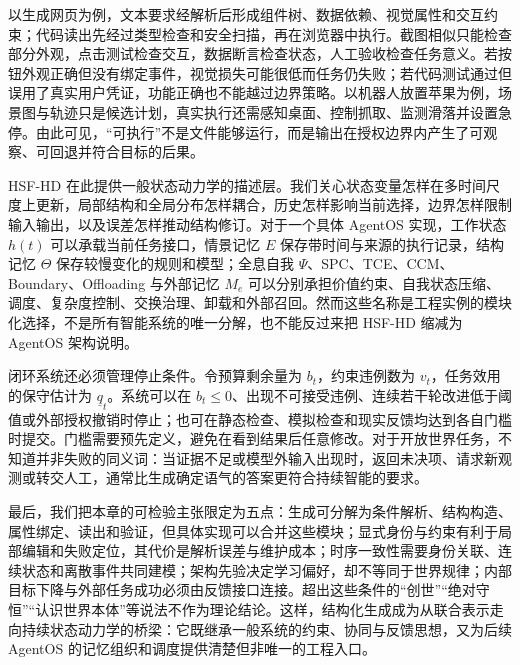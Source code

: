 以生成网页为例，文本要求经解析后形成组件树、数据依赖、视觉属性和交互约束；代码读出先经过类型检查和安全扫描，再在浏览器中执行。截图相似只能检查部分外观，点击测试检查交互，数据断言检查状态，人工验收检查任务意义。若按钮外观正确但没有绑定事件，视觉损失可能很低而任务仍失败；若代码测试通过但误用了真实用户凭证，功能正确也不能越过边界策略。以机器人放置苹果为例，场景图与轨迹只是候选计划，真实执行还需感知桌面、控制抓取、监测滑落并设置急停。由此可见，“可执行”不是文件能够运行，而是输出在授权边界内产生了可观察、可回退并符合目标的后果。

HSF-HD 在此提供一般状态动力学的描述层。我们关心状态变量怎样在多时间尺度上更新，局部结构和全局分布怎样耦合，历史怎样影响当前选择，边界怎样限制输入输出，以及误差怎样推动结构修订。对于一个具体 AgentOS 实现，工作状态 $h(t)$ 可以承载当前任务接口，情景记忆 $E$ 保存带时间与来源的执行记录，结构记忆 $\Theta$ 保存较慢变化的规则和模型；全息自我 $\Psi$、SPC、TCE、CCM、Boundary、Offloading 与外部记忆 $M_e$ 可以分别承担价值约束、自我状态压缩、调度、复杂度控制、交换治理、卸载和外部召回。然而这些名称是工程实例的模块化选择，不是所有智能系统的唯一分解，也不能反过来把 HSF-HD 缩减为 AgentOS 架构说明。

闭环系统还必须管理停止条件。令预算剩余量为 $b_t$，约束违例数为 $v_t$，任务效用的保守估计为 $\underline q_t$。系统可以在 $b_t\le0$、出现不可接受违例、连续若干轮改进低于阈值或外部授权撤销时停止；也可在静态检查、模拟检查和现实反馈均达到各自门槛时提交。门槛需要预先定义，避免在看到结果后任意修改。对于开放世界任务，不知道并非失败的同义词：当证据不足或模型外输入出现时，返回未决项、请求新观测或转交人工，通常比生成确定语气的答案更符合持续智能的要求。

最后，我们把本章的可检验主张限定为五点：生成可分解为条件解析、结构构造、属性绑定、读出和验证，但具体实现可以合并这些模块；显式身份与约束有利于局部编辑和失败定位，其代价是解析误差与维护成本；时序一致性需要身份关联、连续状态和离散事件共同建模；架构先验决定学习偏好，却不等同于世界规律；内部目标下降与外部任务成功必须由反馈接口连接。超出这些条件的“创世”“绝对守恒”“认识世界本体”等说法不作为理论结论。这样，结构化生成成为从联合表示走向持续状态动力学的桥梁：它既继承一般系统的约束、协同与反馈思想，又为后续 AgentOS 的记忆组织和调度提供清楚但非唯一的工程入口。
